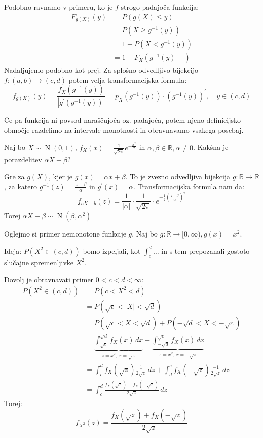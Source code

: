 \documentclass[12pt]{book}
\def\n{\noindent}
\theoremstyle{definition}
\theoremstyle{plain}
\theoremstyle{plain}
\theoremstyle{plain}
\theoremstyle{plain}
\theoremstyle{remark}
\begin{document}
\n Podobno ravnamo v primeru, ko je $f$ strogo padajoča funkcija:
$$
\begin{aligned}
    F_{g(X)}(y)&=P(g(X) \leq y) \\
    &=P\left(X \geq g^{-1}(y)\right) \\ 
    &=1-P\left(X<g^{-1}(y)\right) \\
    &=1-F_X\left(g^{-1}(y)-\right)
\end{aligned}
$$
Nadaljujemo podobno kot prej. Za splošno odvedljivo bijekcijo $f:(a,b) \to (c,d)$ potem velja transformacijska formula: 
$$
f_{g(X)}(y)=\frac{f_X\left(g^{-1}(y)\right)}{\left|g^{\prime}\left(g^{-1}(y)\right)\right|}=p_X\left(g^{-1}(y)\right) \cdot\left(g^{-1}(y)\right)^{\prime}, \quad y \in(c, d)
$$

\n Če pa funkcija ni povsod naraščujoča oz. padajoča, potem njeno definicijsko območje razdelimo na intervale monotnosti in obravnavamo vsakega posebaj. 

\begin{zgled}
    Naj bo $X \sim \operatorname{N}(0, 1)$, $f_X(x)=\frac{1}{\sqrt{2 \pi}} e^{-\frac{x^2}{2}}$ in $\alpha, \beta \in \mathbb{R}, \alpha \neq 0$. Kakšna je porazdelitev $\alpha X + \beta$?

    \n Gre za $g(X)$, kjer je $g(x)=\alpha x + \beta$. To je zvezno odvedljiva bijekcija $g:\mathbb{R} \to \mathbb{R}$, za katero $g^{-1}(z)=\frac{z-\beta}{\alpha}$ in $g^{\prime}(x)=\alpha$. Transformacijska formula nam da: 
    $$
    f_{a X+b}(z)=\frac{1}{|\alpha|} \cdot \frac{1}{\sqrt{2 \pi}} \cdot e^{-\frac{1}{2}\left(\frac{z-\beta}{\alpha}\right)^2}
    $$
    Torej $\alpha X+\beta \sim \operatorname{N}\left(\beta, \alpha^2\right)$
\end{zgled}

\begin{zgled}
    Oglejmo si primer nemonotone funkcije $g$. Naj bo $g: \mathbb{R} \rightarrow[0, \infty), g(x)=x^2$. 

    \n Ideja: $P\left(X^2 \in(c, d)\right)$ bomo izpeljali, kot $\int_c^d\ldots$ in s tem prepozanali gostoto slučajne spremenljivke $X^2$.

    \n Dovolj je obravnavati primer $0<c<d<\infty$:
    $$
    \begin{aligned}
        P\left(X^2 \in(c, d)\right)&=P\left(c<X^2<d\right) \\
        &=P(\sqrt{c}<|X|<\sqrt{d}) \\
        &=P(\sqrt{c}<X<\sqrt{d})+P(-\sqrt{d}<X<-\sqrt{c}) \\
        &=\underbrace{\int_{\sqrt{c}}^{\sqrt{d}} f_X(x) \, d x}_{z = x^2, \, x = \sqrt{z}} +\underbrace{\int_{-\sqrt{d}}^{\sqrt{c}} f_X(x) \, d x}_{z = x^2, \, x = -\sqrt{z}} \\
        &=\int_c^d f_X(\sqrt{z}) \frac{1}{2 \sqrt{z}} \, d z+\int_d^c f_X(-\sqrt{z}) \frac{-1}{2 \sqrt{z}} \, d z \\
        &=\int_c^d \frac{f_X(\sqrt{z})+f_X(-\sqrt{z})}{2 \sqrt{z}}\,  d z
    \end{aligned}
    $$
    Torej: 
    $$
    f_{X^2}(z)=\frac{f_X(\sqrt{z})+f_X(-\sqrt{z})}{2 \sqrt{z}}
    $$
\end{zgled}
\end{document}
